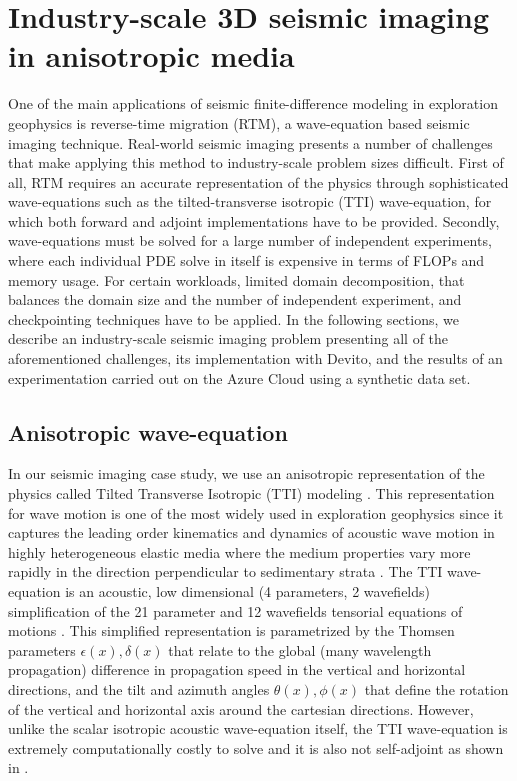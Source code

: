 \documentclass[conference]{IEEEtran}
\begin{document}
\section{Industry-scale 3D seismic imaging in anisotropic
media}\label{industry-scale-3d-seismic-imaging-in-anisotropic-media}

One of the main applications of seismic finite-difference modeling in
exploration geophysics is reverse-time migration (RTM), a wave-equation
based seismic imaging technique. Real-world seismic imaging presents a
number of challenges that make applying this method to industry-scale
problem sizes difficult. First of all, RTM requires an accurate
representation of the physics through sophisticated wave-equations such
as the tilted-transverse isotropic (TTI) wave-equation, for which both
forward and adjoint implementations have to be provided. Secondly,
wave-equations must be solved for a large number of independent
experiments, where each individual PDE solve in itself is expensive in
terms of FLOPs and memory usage. For certain workloads, limited domain
decomposition, that balances the domain size and the number of
independent experiment, and checkpointing techniques have to be applied.
In the following sections, we describe an industry-scale seismic imaging
problem presenting all of the aforementioned challenges, its
implementation with Devito, and the results of an experimentation
carried out on the Azure Cloud using a synthetic data set.

\subsection{Anisotropic wave-equation}\label{anisotropic-wave-equation}

In our seismic imaging case study, we use an anisotropic representation
of the physics called Tilted Transverse Isotropic (TTI) modeling
\cite{thomsen1986}. This representation for wave motion is one of the
most widely used in exploration geophysics since it captures the leading
order kinematics and dynamics of acoustic wave motion in highly
heterogeneous elastic media where the medium properties vary more
rapidly in the direction perpendicular to sedimentary strata
\cite{alkhalifah2000, baysal1983, bubetti2012, bubetti2014, bubesatti2016, chu2011, duveneck, fletcher, fowlertti2010, louboutin2018segeow, whitmore1983, witte2016segpve, xu2014, zhang2005, zhang2011, zhan2013}.
The TTI wave-equation is an acoustic, low dimensional (4 parameters, 2
wavefields) simplification of the 21 parameter and 12 wavefields
tensorial equations of motions \cite{hooke}. This simplified
representation is parametrized by the Thomsen parameters
$\epsilon(x), \delta(x)$ that relate to the global (many wavelength
propagation) difference in propagation speed in the vertical and
horizontal directions, and the tilt and azimuth angles
$\theta(x), \phi(x)$ that define the rotation of the vertical and
horizontal axis around the cartesian directions. However, unlike the
scalar isotropic acoustic wave-equation itself, the TTI wave-equation is
extremely computationally costly to solve and it is also not
self-adjoint as shown in \cite{louboutin2018segeow}.
\end{document}
